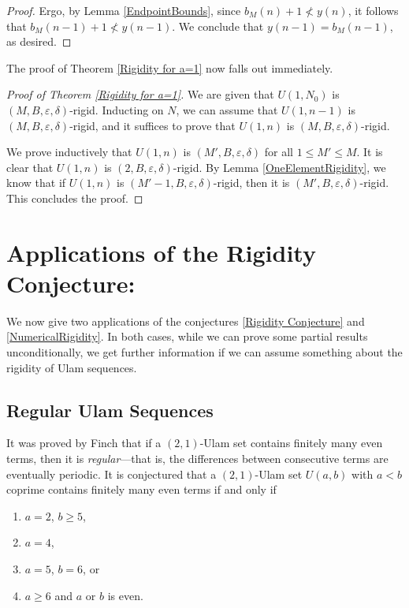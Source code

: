 \documentclass{amsart}
\theoremstyle{theorem}
\theoremstyle{definition}
\begin{document}
\begin{proof}
\noindent Ergo, by Lemma \ref{EndpointBounds}, since $b_M(n) + 1 \nless y(n)$, it follows that $b_M(n - 1) + 1 \nless y(n - 1)$. We conclude that $y(n - 1) = b_M(n - 1)$, as desired.
\end{proof}

The proof of Theorem \ref{Rigidity for a=1} now falls out immediately.

\begin{proof}[Proof of Theorem \ref{Rigidity for a=1}]
We are given that $U(1,N_0)$ is $(M,B,\varepsilon,\delta)$-rigid. Inducting on $N$, we can assume that $U(1,n - 1)$ is $(M,B,\varepsilon,\delta)$-rigid, and it suffices to prove that $U(1,n)$ is $(M,B,\varepsilon,\delta)$-rigid.

We prove inductively that $U(1,n)$ is $(M',B,\varepsilon,\delta)$ for all $1 \leq M' \leq M$. It is clear that $U(1,n)$ is $(2,B,\varepsilon,\delta)$-rigid. By Lemma \ref{OneElementRigidity}, we know that if $U(1,n)$ is $(M' - 1,B,\varepsilon,\delta)$-rigid, then it is $(M',B,\varepsilon,\delta)$-rigid. This concludes the proof.
\end{proof}


\section{Applications of the Rigidity Conjecture:}\label{Applications}
We now give two applications of the conjectures \ref{Rigidity Conjecture} and \ref{NumericalRigidity}. In both cases, while we can prove some partial results unconditionally, we get further information if we can assume something about the rigidity of Ulam sequences.

\subsection{Regular Ulam Sequences} It was proved by Finch \cite{finch_1991, finch_1992_1, finch_1992_2} that if a $(2,1)$-Ulam set contains finitely many even terms, then it is \emph{regular}---that is, the differences between consecutive terms are eventually periodic. It is conjectured that a $(2,1)$-Ulam set $U(a,b)$ with $a<b$ coprime contains finitely many even terms if and only if

	\begin{enumerate}
		\item $a = 2$, $b \geq 5$,
        \item $a = 4$,
        \item $a = 5$, $b = 6$, or
        \item $a \geq 6$ and $a$ or $b$ is even.
	\end{enumerate}
    
\end{document}
